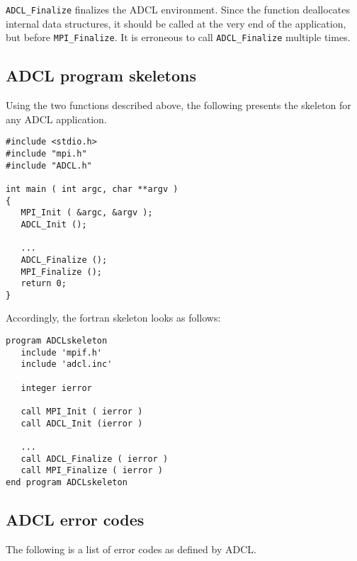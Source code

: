 {\tt ADCL\_Finalize} finalizes the ADCL environment. Since the function deallocates internal data structures, it should be called at the very end of the application, but before {\tt MPI\_Finalize}. It is erroneous to call {\tt ADCL\_Finalize} multiple times.

\subsection{ADCL program skeletons}

Using the two functions described above, the following presents the skeleton for any ADCL application.
\begin{verbatim}
#include <stdio.h>
#include "mpi.h"
#include "ADCL.h"

int main ( int argc, char **argv ) 
{
   MPI_Init ( &argc, &argv );
   ADCL_Init ();
   
   ...
   ADCL_Finalize ();
   MPI_Finalize ();
   return 0;
}
\end{verbatim}

Accordingly, the fortran skeleton looks as follows:
\begin{verbatim}
program ADCLskeleton
   include 'mpif.h'
   include 'adcl.inc'
   
   integer ierror
   
   call MPI_Init ( ierror )
   call ADCL_Init (ierror )
   
   ...
   call ADCL_Finalize ( ierror )
   call MPI_Finalize ( ierror )
end program ADCLskeleton
\end{verbatim}

\subsection{ADCL error codes}

The following is a list of error codes as defined by ADCL.

